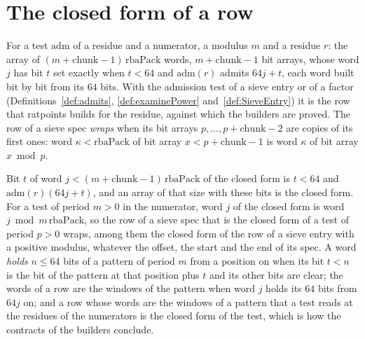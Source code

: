 \section{The closed form of a row}\label{sec:closedForm}

\begin{definition}\label{def:closedRow}
  \leanok
  For a test $\mathrm{adm}$ of a residue and a numerator, a modulus $m$ and a residue $r$: the array
  of $(m + \mathrm{chunk} - 1)\,\mathrm{rbaPack}$ words, $m + \mathrm{chunk} - 1$ bit arrays, whose
  word $j$ has bit $t$ set exactly when $t < 64$ and $\mathrm{adm}(r)$ admits $64 j + t$, each word
  built bit by bit from its $64$ bits. With the admission test of a sieve entry or of a factor
  (Definitions~\ref{def:admits}, \ref{def:examinePower} and~\ref{def:SieveEntry}) it is the row that
  ratpoints builds for the residue, against which the builders are proved. The row of a sieve spec
  \emph{wraps} when its bit arrays $p, \dots, p + \mathrm{chunk} - 2$ are copies of its first ones:
  word $\kappa < \mathrm{rbaPack}$ of bit array $x < p + \mathrm{chunk} - 1$ is word $\kappa$ of bit
  array $x \bmod p$.
\end{definition}

\begin{lemma}\label{lem:closedRow}
  \leanok
  Bit $t$ of word $j < (m + \mathrm{chunk} - 1)\,\mathrm{rbaPack}$ of the closed form is $t < 64$
  and $\mathrm{adm}(r)(64 j + t)$, and an array of that size with these bits is the closed form. For
  a test of period $m > 0$ in the numerator, word $j$ of the closed form is word $j \bmod
  m\,\mathrm{rbaPack}$, so the row of a sieve spec that is the closed form of a test of period $p >
  0$ wraps, among them the closed form of the row of a sieve entry with a positive modulus, whatever
  the offset, the start and the end of its spec. A word \emph{holds} $n \le 64$ bits of a pattern of
  period $m$ from a position on when its bit $t < n$ is the bit of the pattern at that position plus
  $t$ and its other bits are clear; the words of a row are the windows of the pattern when word $j$
  holds its $64$ bits from $64 j$ on; and a row whose words are the windows of a pattern that a test
  reads at the residues of the numerators is the closed form of the test, which is how the contracts
  of the builders conclude.
\end{lemma}

